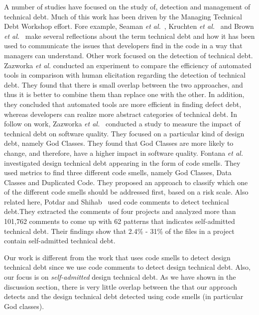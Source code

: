 A number of studies have focused on the study of, detection and management of technical debt. Much of this work has been driven by the Managing Technical Debt Workshop effort. Fore example, Seaman \textit{et al.}~\cite{Seaman2011}, Kruchten \textit{et al.}~\cite{Kruchten2013IWMTD} and Brown \textit{et al.}~\cite{Brown2010MTD} make several reflections about the term technical debt and how it has been used to communicate the issues that developers find in the code in a way that managers can understand. Other work focused on the detection of technical debt. Zazworka \textit{et al.} \cite{Zazworka2013CSE} conducted an experiment to compare the efficiency of automated tools in comparison with human elicitation regarding the detection of technical debt. They found that there is small overlap between the two approaches, and thus it is better to combine them than replace one with the other. In addition, they concluded that automated tools are more efficient in finding defect debt, whereas developers can realize more abstract categories of technical debt.
In follow on work, Zazworka \textit{et al.}~\cite{Zazworka2011MTD} conducted a study to measure the impact of technical debt on software quality. They focused on a particular kind of design debt, namely God Classes. They found that God Classes are more likely to change, and therefore, have a higher impact in software quality. Fontana \textit{et al.}~\cite{Fontana2012MTD} investigated design technical debt appearing in the form of code smells. They used metrics to find three different code smells, namely God Classes, Data Classes and Duplicated Code. They proposed an approach to classify which one of the different code smells should be addressed first, based on a risk scale. Also related here, Potdar and Shihab~\cite{Potdar2014ICSME} used code comments to detect technical debt.They extracted the comments of four projects and analyzed more than 101,762 comments to come up with 62  patterns that indicates self-admitted technical debt. Their findings show that 2.4\% - 31\% of the files in a project contain self-admitted technical debt.

Our work is different from the work that uses code smells to detect design technical debt since we use code comments to detect design technical debt. Also, our focus is on \emph{self-admitted} design technical debt. As we have shown in the discussion section, there is very little overlap between the \SADTD that our approach detects and the design technical debt detected using code smells (in particular God classes).

